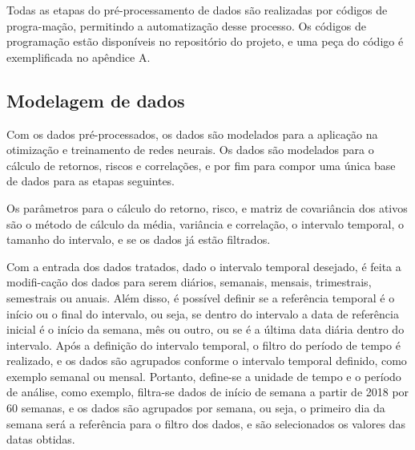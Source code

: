         \ipar Todas as etapas do pré-processamento de dados são realizadas por códigos de progra-mação, permitindo a automatização desse processo. Os códigos de programação estão disponíveis no repositório do projeto, e uma peça do código é exemplificada no apêndice A.

    \subsection{Modelagem de dados}

        \ipar Com os dados pré-processados, os dados são modelados para a aplicação na otimização e treinamento de redes neurais. Os dados são modelados para o cálculo de retornos, riscos e correlações, e por fim para compor uma única base de dados para as etapas seguintes.

        \ipar Os parâmetros para o cálculo do retorno, risco, e matriz de covariância dos ativos são o método de cálculo da média, variância e correlação, o intervalo temporal, o tamanho do intervalo, e se os dados já estão filtrados.
        
        \ipar Com a entrada dos dados tratados, dado o intervalo temporal desejado, é feita a modifi-cação dos dados para serem diários, semanais, mensais, trimestrais, semestrais ou anuais. Além disso, é possível definir se a referência temporal é o início ou o final do intervalo, ou seja, se dentro do intervalo a data de referência inicial é o início da semana, mês ou outro, ou se é a última data diária dentro do intervalo. Após a definição do intervalo temporal, o filtro do período de tempo é realizado, e os dados são agrupados conforme o intervalo temporal definido, como exemplo semanal ou mensal. Portanto, define-se a unidade de tempo e o período de análise, como exemplo, filtra-se dados de início de semana a partir de 2018 por 60 semanas, e os dados são agrupados por semana, ou seja, o primeiro dia da semana será a referência para o filtro dos dados, e são selecionados os valores das datas obtidas. 

